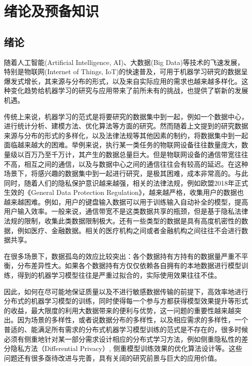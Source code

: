 \chapter{\hspace{-1mm}\bf 绪论及预备知识}
\label{chap1}


\section{绪论}
\label{sec:introduction}


随着人工智能(Artificial Intelligence, AI)、大数据(Big Data)等技术的飞速发展，特别是物联网(Internet of Things, IoT)的快速普及，可用于机器学习研究的数据呈爆发式增长，其来源与分布的形式，以及来自实际应用的需求也越来越多样化。这种变化趋势给机器学习的研究与应用带来了前所未有的挑战，也提供了崭新的发展机遇。

传统上来说，机器学习的范式是将要研究的数据集中到一起，例如一个数据中心，进行统计分析、建模方法、优化算法等方面的研究。然而随着上文提到的研究数据来源与分布的形式的多样化，以及法律法规等其他因素的制约，将数据集中到一起面临越来越大的困难。举例来说，执行某一类任务的物联网设备往往数量庞大，数量级以百万乃至千万计，其产生的数据总量巨大。但是物联网设备的通信带宽往往不高，相互之间的通信，以及与数据中心之间的通信往往会有较高的延迟。在这种场景下，将感兴趣的数据集中到一起进行研究，是极其困难，成本非常高的。与此同时，随着人们的隐私保护意识越来越强，相关的法律法规，例如欧盟2018年正式生效的《General Data Protection Regulation》，越来越严格，收集用户的数据也越来越困难\citep{Albrecht_2016}。例如，用户的键盘输入数据可以用于训练输入自动补全的模型，提高用户输入效率\citep{fl_keyboard}。一般来说，通信带宽不是这类数据共享的瓶颈，但是基于隐私法律法规的限制，收集此类数据限制极大。还有一些类型的数据是具有高度机密性的数据，例如医疗、金融数据。相关的医疗机构之间或者金融机构之间往往不会进行数据共享。

在很多场景下，数据孤岛的效应比较突出：各个数据持有方持有的数据量严重不平衡，分布差异性大。如果各个数据持有方仅仅依赖各自拥有的本地数据进行模型训练，得到的机器学习模型往往是严重过拟合的，实际使用效果往往不佳。

因此，如何在尽可能地保证质量以及不进行敏感数据传输的前提下，高效率地进行分布式的机器学习模型的训练，同时使得每一个参与方都获得模型效果提升等形式的收益，最大限度的利用大数据带来的便利与优势，这一问题的重要性越来越突出。因为场景的多样性，或者说数据分布的多样性，以及相应需求的多样性，一个普适的、能满足所有需求的分布式机器学习模型训练的范式是不存在的，很多时候必须有侧重地针对某一部分需求设计相应的分布式学习方法，例如侧重隐私性的差分隐私方法（Differential Privacy）\citep{Dwork_2008_DP}, 侧重模型训练效果的优化算法设计\citep{boyd2011distributed}等。这些问题还有很多亟待改进与完善，具有关阔的研究前景与巨大的应用价值。

